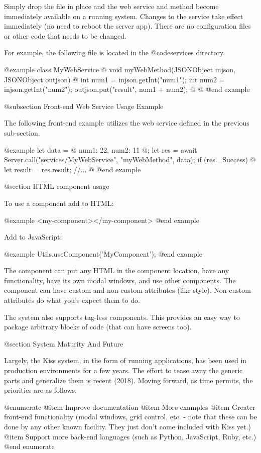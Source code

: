 Simply drop the file in place and the web service and method become
immediately available on a running system.  Changes to the service
take effect immediately (no need to reboot the server app).  There are
no configuration files or other code that needs to be changed.

For example, the following file is located in the
@code{services} directory.

@example
class MyWebService @{
    void myWebMethod(JSONObject injson, JSONObject outjson) @{
        int num1 = injson.getInt("num1");
        int num2 = injson.getInt("num2");
        outjson.put("result", num1 + num2);
    @}
@}
@end example

@subsection Front-end Web Service Usage Example

The following front-end example utilizes the web service defined in the
previous sub-section.

@example
let data = @{
    num1:  22,
    num2:  11
@};
let res = await Server.call("services/MyWebService", "myWebMethod", data);
if (res._Success) @{
    let result = res.result;
    //...
@}
@end example
    
@section HTML component usage
   
To use a component add to HTML:

@example
<my-component></my-component>
@end example

Add to JavaScript:

@example
Utils.useComponent('MyComponent');
@end example
    
The component can put any HTML in the component location, have any
functionality, have its own modal windows, and use other components.
The component can have custom and non-custom attributes (like style).
Non-custom attributes do what you's expect them to do.

The system also supports tag-less components.  This provides an easy
way to package arbitrary blocks of code (that can have screens too).

@section System Maturity And Future

Largely, the Kiss system, in the form of running applications, has
been used in production environments for a few years.  The effort to
tease away the generic parts and generalize them is recent (2018).
Moving forward, as time permits, the priorities are as follows:

@enumerate
@item
Improve documentation
@item
More examples
@item
Greater front-end functionality (modal windows, grid control, etc. - note that these can be done by any other known facility.  They just don't come included with Kiss yet.)
@item
Support more back-end languages (such as Python, JavaScript, Ruby, etc.)
@end enumerate

